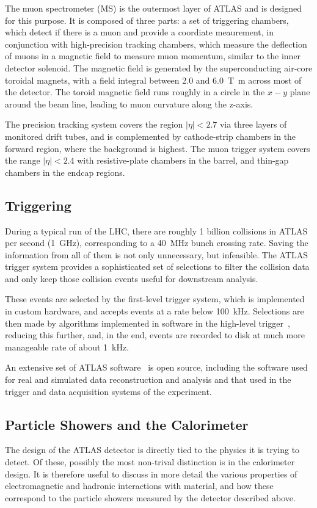 The muon spectrometer (MS) is the outermost layer of ATLAS and is designed for this purpose. It is composed 
of three parts: a set of triggering chambers, which detect if there is a muon and provide 
a coordiate meaurement, in conjunction with high-precision tracking chambers, which measure the deflection of 
muons in a magnetic field to measure muon momentum, similar to the inner detector solenoid. The magnetic 
field is generated by the superconducting air-core toroidal magnets, with a field integral between 
\num{2.0} and \SI{6.0}{\tesla\metre} across most of the detector. The toroid magnetic field runs roughly 
in a circle in the $x-y$ plane around the beam line, leading to muon curvature along the z-axis.

The precision tracking system covers the region \(|\eta| < 2.7\) via three layers of monitored drift 
tubes, and is complemented by cathode-strip chambers in the forward region, where the background is highest.
The muon trigger system covers the range \(|\eta| < 2.4\) with resistive-plate chambers in the barrel, and thin-gap chambers in the endcap regions.

\subsection{Triggering}
During a typical run of the LHC, there are roughly 1 billion collisions in ATLAS per second (\SI{1}{\GHz}), corresponding
to a \SI{40}{\MHz} bunch crossing rate. 
Saving the information from all of them is not only unnecessary, but infeasible. The ATLAS trigger 
system provides a sophisticated set of selections to filter the collision data and only keep those 
collision events useful for downstream analysis.

These events are selected by the first-level trigger system, which is implemented in custom hardware,
and accepts events at a rate below \SI{100}{\kHz}. Selections are then made by algorithms implemented in software 
in the high-level trigger~\cite{TRIG-2016-01}, reducing this further, and, in the end, events 
are recorded to disk at much more manageable rate of about \SI{1}{\kHz}.

An extensive set of ATLAS software~\cite{ATL-SOFT-PUB-2021-001} is open source, including the software used for real and simulated data reconstruction and analysis and that used in the trigger and data acquisition systems of the experiment.

\subsection{Particle Showers and the Calorimeter}
The design of the ATLAS detector is directly tied to the physics it is trying to detect. Of these, 
possibly the most non-trival distinction is in the calorimeter design. It is therefore useful to discuss in more 
detail the various properties of electromagnetic and hadronic interactions with material, and how these 
correspond to the particle showers measured by the detector described above. 

